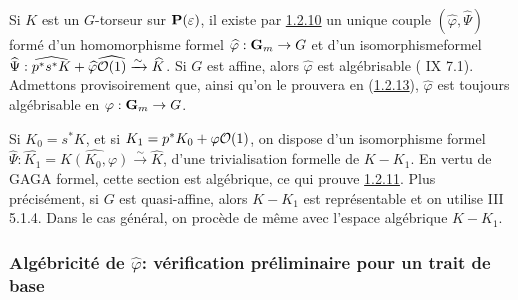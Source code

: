 \documentclass[10pt]{../fichiers-configuration-latex/smfart}
\begin{document}
\noindent
Si $K$ est un $G$-torseur sur $\mathbf{P}(\varepsilon)$, il existe par
\hyperref[XVIII.subsubsec1.2.10]{1.2.10} un unique couple
$(\widehat{\varphi},\widehat{\Psi})$ formé
d'un homomorphisme formel
$\widehat{\varphi}:\mathbf{G}_{m}\rightarrow G$ et d'un
isomorphisme\pageoriginale formel
$\widehat{\Psi}:\widehat{p^{\ast}s^{\ast}K}+
\widehat{\varphi}\widehat{{\mathcal O}(1)}\xrightarrow{\sim} 
\widehat{K}$. Si $G$ est affine, alors
$\widehat{\varphi}$ est algébrisable ( IX
7.1). Admettons provisoirement que, ainsi qu'on le prouvera en
(\hyperref[XVIII.subsubsec1.2.13]{1.2.13}), $\widehat{\varphi}$ est toujours algébrisable
en $\varphi:\mathbf{G}_{m}\rightarrow G$.

Si $K_{0}=s^{\ast}K$, et si $K_{1}=p^{\ast}K_{0}+\varphi{\mathcal O}(1)$, on
dispose d'un isomorphisme formel
$\widehat{\Psi}:\widehat{K_{1}}=\widehat{K(K_{0},\varphi)}\xrightarrow{\sim}
\widehat{K}$, \ie d'une trivialisation formelle de
$K-K_{1}$. En vertu de GAGA formel, cette section est algébrique, ce
qui prouve \hyperref[XVIII.subsubsec1.2.11]{1.2.11}. Plus précisément, si $G$ est
quasi-affine, alors $K-K_{1}$ est représentable et on utilise \EGA III
5.1.4. Dans le cas général, on procède de même avec l'espace
algébrique $K-K_{1}$.

\subsubsection{Algébricité de $\widehat{\varphi}$: vérification
  préliminaire pour un trait de base}
\end{document}
